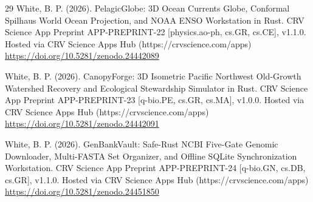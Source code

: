 \documentclass[10pt,letterpaper]{article}
\begin{document}
\begin{thebibliography}{29}
 White, B. P. (2026). PelagicGlobe: 3D Ocean Currents Globe, Conformal Spilhaus World Ocean Projection, and NOAA ENSO Workstation in Rust. CRV Science App Preprint APP-PREPRINT-22 [physics.ao-ph, cs.GR, cs.CE], v1.1.0. Hosted via CRV Science Apps Hub (https://crvscience.com/apps) \url{https://doi.org/10.5281/zenodo.24442089}

 White, B. P. (2026). CanopyForge: 3D Isometric Pacific Northwest Old-Growth Watershed Recovery and Ecological Stewardship Simulator in Rust. CRV Science App Preprint APP-PREPRINT-23 [q-bio.PE, cs.GR, cs.MA], v1.0.0. Hosted via CRV Science Apps Hub (https://crvscience.com/apps) \url{https://doi.org/10.5281/zenodo.24442091}

 White, B. P. (2026). GenBankVault: Safe-Rust NCBI Five-Gate Genomic Downloader, Multi-FASTA Set Organizer, and Offline SQLite Synchronization Workstation. CRV Science App Preprint APP-PREPRINT-24 [q-bio.GN, cs.DB, cs.GR], v1.1.0. Hosted via CRV Science Apps Hub (https://crvscience.com/apps) \url{https://doi.org/10.5281/zenodo.24451850}
\end{thebibliography}
\end{document}

